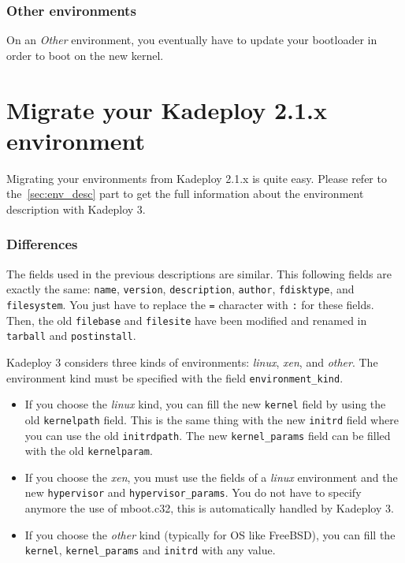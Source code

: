 \documentclass[a4wide,10pt,oneside]{book}
\begin{document}
\subsubsection{Other environments}
On an \emph{Other} environment, you eventually have to update your bootloader in order to boot on the new kernel.

\section{Migrate your Kadeploy 2.1.x environment}
Migrating your environments from Kadeploy 2.1.x is quite easy. Please refer to the~\ref{sec:env_desc} part to get the full information about the environment description with Kadeploy 3.

\subsubsection{Differences}
The fields used in the previous descriptions are similar. This following fields are exactly the same: \texttt{name}, \texttt{version}, \texttt{description}, \texttt{author}, \texttt{fdisktype}, and \texttt{filesystem}. You just have to replace the \texttt{=} character with \texttt{:} for these fields.
Then, the old \texttt{filebase} and \texttt{filesite} have been modified and renamed in \texttt{tarball} and \texttt{postinstall}.

Kadeploy 3 considers three kinds of environments: \textit{linux}, \textit{xen}, and \textit{other}. The environment kind must be specified with the field \texttt{environment\_kind}.
\begin{itemize}
\item If you choose the \textit{linux} kind, you can fill the new \texttt{kernel} field by using the old \texttt{kernelpath} field. This is the same thing with the new \texttt{initrd} field where you can use the old \texttt{initrdpath}. The new \texttt{kernel\_params} field can be filled with the old \texttt{kernelparam}.
\item If you choose the \textit{xen}, you must use the fields of a \textit{linux} environment and the new \texttt{hypervisor} and \texttt{hypervisor\_params}. You do not have to specify anymore the use of mboot.c32, this is automatically handled by Kadeploy 3.
\item If you choose the \textit{other} kind (typically for OS like FreeBSD), you can fill the \texttt{kernel}, \texttt{kernel\_params} and \texttt{initrd} with any value.
\end{itemize}
\end{document}
